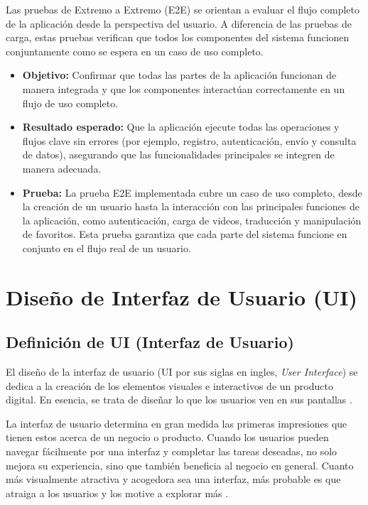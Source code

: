Las pruebas de Extremo a Extremo (E2E) se orientan a evaluar el flujo completo de la aplicación desde la perspectiva del usuario. A diferencia de las pruebas de carga, estas pruebas verifican que todos los componentes del sistema funcionen conjuntamente como se espera en un caso de uso completo.

\begin{itemize} 
\item \textbf{Objetivo:} Confirmar que todas las partes de la aplicación funcionan de manera integrada y que los componentes interactúan correctamente en un flujo de uso completo. \item \textbf{Resultado esperado:} Que la aplicación ejecute todas las operaciones y flujos clave sin errores (por ejemplo, registro, autenticación, envío y consulta de datos), asegurando que las funcionalidades principales se integren de manera adecuada. 
\item \textbf{Prueba:} La prueba E2E implementada cubre un caso de uso completo, desde la creación de un usuario hasta la interacción con las principales funciones de la aplicación, como autenticación, carga de videos, traducción y manipulación de favoritos. Esta prueba garantiza que cada parte del sistema funcione en conjunto en el flujo real de un usuario. 
\end{itemize}












\section{Diseño de Interfaz de Usuario (UI)}
\subsection{Definición de UI (Interfaz de Usuario)}
El diseño de la interfaz de usuario (UI por sus siglas en ingles, \textit{User Interface}) se dedica a la creación de los elementos visuales e interactivos de un producto digital. En esencia, se trata de diseñar lo que los usuarios ven en sus pantallas \cite{OrtegaSF}.

La interfaz de usuario determina en gran medida las primeras impresiones que tienen estos acerca de un negocio o producto. Cuando los usuarios pueden navegar fácilmente por una interfaz y completar las tareas deseadas, no solo mejora su experiencia, sino que también beneficia al negocio en general. Cuanto más visualmente atractiva y acogedora sea una interfaz, más probable es que atraiga a los usuarios y los motive a explorar más \cite{OrtegaSF}.

